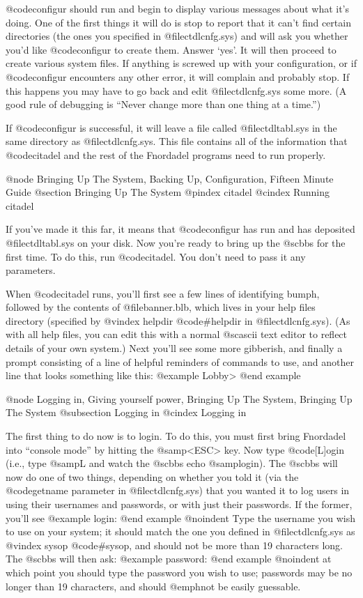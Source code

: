 @code{configur} should run and begin to display various messages about what
it's doing.  One of the first things it will do is stop to report that it
can't find certain directories (the ones you specified in @file{ctdlcnfg.sys})
and will ask you whether you'd like @code{configur} to create them.  Answer
`yes'.  It will then proceed to create various system files.
If anything is screwed up with your configuration, or if @code{configur}
encounters
any other error, it will complain and probably stop.  If this happens you
may have to go back and edit @file{ctdlcnfg.sys} some more.  (A good rule
of debugging is ``Never change more than one thing at a time.'')

If @code{configur} is successful, it will leave a file called
@file{ctdltabl.sys} in the same directory as @file{ctdlcnfg.sys}.  This file
contains all of the information that @code{citadel} and the rest of the
Fnordadel programs need to run properly.

@node Bringing Up The System, Backing Up, Configuration, Fifteen Minute Guide
@section Bringing Up The System
@pindex citadel
@cindex Running citadel

If you've made it this far, it means that @code{configur} has run and has
deposited @file{ctdltabl.sys} on your disk.  Now you're ready to bring up
the @sc{bbs} for the first time.  To do this, run @code{citadel}.  You don't
need to pass it any parameters.

When @code{citadel} runs, you'll first see a few lines of identifying
bumph, followed by the contents of @file{banner.blb}, which lives in your
help files directory (specified by
@vindex helpdir
@code{#helpdir} in @file{ctdlcnfg.sys}).
(As with all help files, you can edit this with a normal @sc{ascii} text
editor to reflect details of your own system.)  Next you'll see some more
gibberish, and finally a prompt consisting of a line of helpful reminders
of commands to use, and another line that looks something like this:
@example
Lobby>
@end example

@node Logging in, Giving yourself power, Bringing Up The System, Bringing Up The System
@subsection Logging in
@cindex Logging in

The first thing to do now is to login.  To do this, you must first bring
Fnordadel into ``console mode'' by hitting the @samp{<ESC>} key.  Now type
@code{[L]ogin} (i.e., type @samp{L} and watch the @sc{bbs} echo @samp{login}).
The @sc{bbs} will now do one of two things, depending on whether you told it (via
the @code{getname} parameter in @file{ctdlcnfg.sys}) that you wanted it to
log users in using their usernames and passwords, or with just their
passwords.  If the former, you'll see
@example
login:
@end example
@noindent
Type the username you wish to use on your system; it should match the one you
defined in @file{ctdlcnfg.sys} as
@vindex sysop
@code{#sysop}, and should not be more than
19 characters long.  The @sc{bbs} will then ask:
@example
password:
@end example
@noindent
at which point you should type the password you wish to use; passwords may
be no longer than 19 characters, and should @emph{not} be easily guessable.


